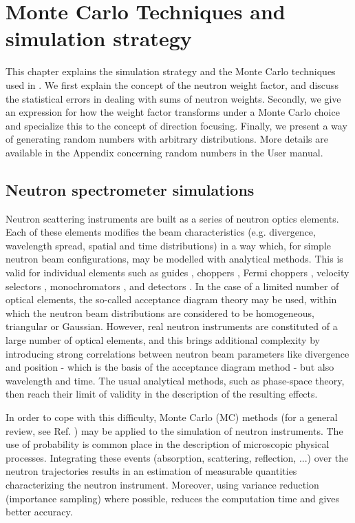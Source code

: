 \chapter{Monte Carlo Techniques and simulation strategy}
\label{s:MCtechniques}

This chapter explains the simulation strategy and the Monte Carlo
techniques used in \MCS. We first explain the concept of the neutron
weight factor, and discuss the statistical errors in dealing with sums
of neutron weights.  Secondly, we give an expression for how the weight
factor transforms under a Monte Carlo choice and specialize this
to the concept of direction focusing.  Finally, we present a way of
generating random numbers with arbitrary distributions.
More details are available in the Appendix concerning random numbers in the User manual.


\section{Neutron spectrometer simulations}

Neutron scattering instruments are built as a series of neutron optics elements. Each of these elements modifies the beam characteristics (e.g. divergence, wavelength spread, spatial and time distributions) in a way which, for simple neutron beam configurations, may be modelled with analytical methods. This is valid for individual elements such as guides \cite{Leibnitz63,Mildner90}, choppers \cite{Lowde60,Copley03}, Fermi choppers \cite{Fermi47,Peters05}, velocity selectors \cite{Clark66}, monochromators \cite{Freund83,Sears97,Shirane02,Alianelli04}, and detectors \cite{Radeka74,Charpak89,Manzin04}. In the case of a limited number of optical elements, the so-called acceptance diagram theory \cite{Mildner90,Copley93,Cussen03} may be used, within which the neutron beam distributions are considered to be homogeneous, triangular or Gaussian.
However, real neutron instruments are constituted of a large number of optical elements, and this brings additional complexity by introducing strong correlations between neutron beam parameters like divergence and position - which is the basis of the acceptance diagram method - but also wavelength and time. The usual analytical methods, such as phase-space theory, then reach their limit of validity in the description of the resulting effects.

In order to cope with this difficulty, Monte Carlo (MC) methods (for a general review, see Ref. \cite{James80}) may be applied to the simulation of neutron instruments.
The use of probability is common place in the description of microscopic physical processes. Integrating these events (absorption, scattering, reflection, ...) over the neutron trajectories
results in an estimation of measurable quantities characterizing the neutron instrument. Moreover, using variance reduction (importance sampling)
where possible, reduces the computation time and gives better accuracy.

